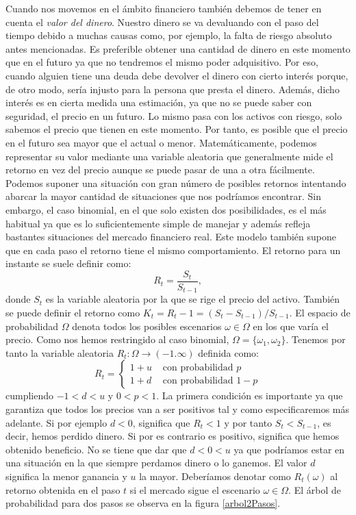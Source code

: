 Cuando nos movemos en el ámbito financiero también debemos de tener en cuenta el \textit{valor del dinero}. Nuestro dinero se va devaluando con el paso del tiempo debido a muchas causas como, por ejemplo, la falta de riesgo absoluto antes mencionadas. Es preferible obtener una cantidad de dinero en este momento que en el futuro ya que no tendremos el mismo poder adquisitivo. Por eso, cuando alguien tiene una deuda debe devolver el dinero con cierto interés porque, de otro modo, sería injusto para la persona que presta el dinero. Además, dicho interés es en cierta medida una estimación, ya que no se puede saber con seguridad, el precio en un futuro. Lo mismo pasa con los activos con riesgo, solo sabemos el precio que tienen en este momento. Por tanto, es posible que el precio en el futuro sea mayor que el actual o menor. Matemáticamente, podemos representar su valor mediante una variable aleatoria que generalmente mide el retorno en vez del precio aunque se puede pasar de una a otra fácilmente. Podemos suponer una situación con gran número de posibles retornos intentando abarcar la mayor cantidad de situaciones que nos podríamos encontrar. Sin embargo, el caso binomial, en el que solo existen dos posibilidades, es el más habitual ya que es lo suficientemente simple de manejar y además refleja bastantes situaciones del mercado financiero real. Este modelo también supone que en cada paso el retorno tiene el mismo comportamiento. El retorno para un instante se suele definir como:
\[
R_t = \frac{S_t}{S_{t-1}},
\]
donde $ S_t $ es la variable aleatoria por la que se rige el precio del activo. También se puede definir el retorno como $ K_t = R_t - 1 = (S_t-S_{t-1})/S_{t-1}$. El espacio de probabilidad $ \Omega $ denota todos los posibles escenarios $ \omega \in \Omega $ en los que varía el precio. Como nos hemos restringido al caso binomial, $ \Omega = \{ \omega_1, \omega_2\} $. Tenemos por tanto la variable aleatoria $ R_t:\Omega \longrightarrow (-1.\infty) $ definida como:
\[
R_t = \begin{cases}
1+ u & \text{ con probabilidad } p\\
1+ d & \text{ con probabilidad } 1-p
\end{cases}
\]
cumpliendo $ -1 < d < u $ y $ 0 < p <1 $. La primera condición es importante ya que garantiza que todos los precios van a ser positivos tal y como especificaremos más adelante. Si por ejemplo $ d < 0 $, significa que $ R_t < 1 $ y por tanto $ S_t < S_{t-1} $, es decir, hemos perdido dinero. Si por es contrario es positivo, significa que hemos obtenido beneficio. No se tiene que dar que $ d < 0 < u$ ya que podríamos estar en una situación en la que siempre perdamos dinero o lo ganemos. El valor $ d $ significa la menor ganancia y $ u $ la mayor. Deberíamos denotar como $ R_t(\omega) $ al retorno obtenida en el paso $ t $ si el mercado sigue el escenario $ \omega \in \Omega $. El árbol de probabilidad para dos pasos se observa en la figura \ref{arbol2Pasos}.

